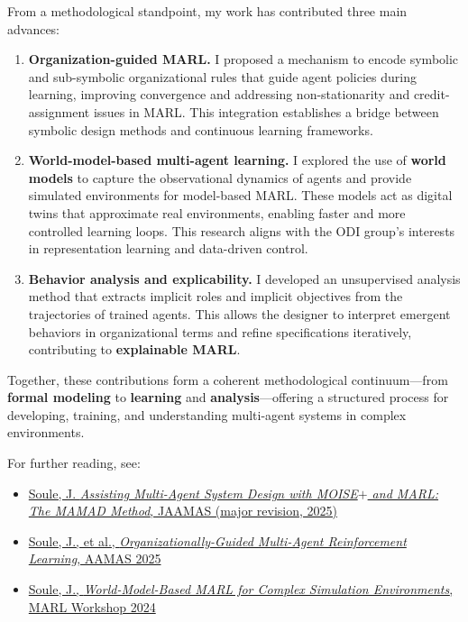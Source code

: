 \documentclass[11pt,a4paper,sans]{moderncv}
\begin{document}
From a methodological standpoint, my work has contributed three main advances:

\begin{enumerate}
  \item \textbf{Organization-guided MARL.}
        I proposed a mechanism to encode symbolic and sub-symbolic organizational rules that guide agent policies during learning, improving convergence and addressing non-stationarity and credit-assignment issues in MARL. This integration establishes a bridge between symbolic design methods and continuous learning frameworks.

  \item \textbf{World-model-based multi-agent learning.}
        I explored the use of \textbf{world models} to capture the observational dynamics of agents and provide simulated environments for model-based MARL. These models act as digital twins that approximate real environments, enabling faster and more controlled learning loops. This research aligns with the ODI group's interests in representation learning and data-driven control.

  \item \textbf{Behavior analysis and explicability.}
        I developed an unsupervised analysis method that extracts implicit roles and implicit objectives from the trajectories of trained agents. This allows the designer to interpret emergent behaviors in organizational terms and refine specifications iteratively, contributing to \textbf{explainable MARL}.
\end{enumerate}

Together, these contributions form a coherent methodological continuum—from \textbf{formal modeling} to \textbf{learning} and \textbf{analysis}—offering a structured process for developing, training, and understanding multi-agent systems in complex environments.

For further reading, see:
\begin{itemize}
  \item \href{https://julien6.github.io/publications/JAAMAS2025_MAMAD.pdf}{Soule, J. \emph{Assisting Multi-Agent System Design with MOISE$+$ and MARL: The MAMAD Method}, JAAMAS (major revision, 2025)}
  \item \href{https://julien6.github.io/publications/AAMAS2025_MARL_Org.pdf}{Soule, J., et al., \emph{Organizationally-Guided Multi-Agent Reinforcement Learning}, AAMAS 2025}
  \item \href{https://julien6.github.io/publications/Workshop2024_WorldModel.pdf}{Soule, J., \emph{World-Model-Based MARL for Complex Simulation Environments}, MARL Workshop 2024}
\end{itemize}
\end{document}
